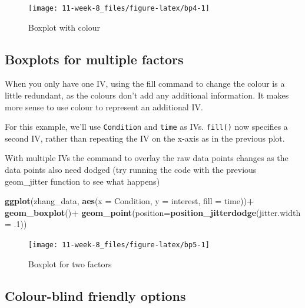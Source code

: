 \documentclass[]{book}
\newenvironment{Shaded}{\begin{snugshade}}{\end{snugshade}}
\newcommand{\DataTypeTok}[1]{\textcolor[rgb]{0.13,0.29,0.53}{#1}}
\newcommand{\FloatTok}[1]{\textcolor[rgb]{0.00,0.00,0.81}{#1}}
\newcommand{\KeywordTok}[1]{\textcolor[rgb]{0.13,0.29,0.53}{\textbf{#1}}}
\newcommand{\NormalTok}[1]{#1}
\newcommand{\OperatorTok}[1]{\textcolor[rgb]{0.81,0.36,0.00}{\textbf{#1}}}
\newcommand{\StringTok}[1]{\textcolor[rgb]{0.31,0.60,0.02}{#1}}
\begin{document}
\begin{figure}

{\centering \texttt{[image: 11-week-8\_files/figure-latex/bp4-1]} 

}

\caption{Boxplot with colour}\label{fig:bp4}
\end{figure}

\hypertarget{boxplots-for-multiple-factors}{%
\subsection{Boxplots for multiple factors}\label{boxplots-for-multiple-factors}}

When you only have one IV, using the fill command to change the colour is a little redundant, as the colours don't add any additional information. It makes more sense to use colour to represent an additional IV.

For this example, we'll use \texttt{Condition} and \texttt{time} as IVs. \texttt{fill()} now specifies a second IV, rather than repeating the IV on the x-axis as in the previous plot.

With multiple IVs the command to overlay the raw data points changes as the data points also need dodged (try running the code with the previous geom\_jitter function to see what happens)

\begin{Shaded}
\begin{Highlighting}[]
\KeywordTok{ggplot}\NormalTok{(zhang_data, }\KeywordTok{aes}\NormalTok{(}\DataTypeTok{x =}\NormalTok{ Condition, }\DataTypeTok{y =}\NormalTok{ interest, }\DataTypeTok{fill =}\NormalTok{ time))}\OperatorTok{+}
\StringTok{  }\KeywordTok{geom_boxplot}\NormalTok{()}\OperatorTok{+}
\StringTok{  }\KeywordTok{geom_point}\NormalTok{(}\DataTypeTok{position=}\KeywordTok{position_jitterdodge}\NormalTok{(}\DataTypeTok{jitter.width =} \FloatTok{.1}\NormalTok{))}
\end{Highlighting}
\end{Shaded}

\begin{figure}

{\centering \texttt{[image: 11-week-8\_files/figure-latex/bp5-1]} 

}

\caption{Boxplot for two factors}\label{fig:bp5}
\end{figure}

\hypertarget{colour-blind-friendly-options}{%
\subsection{Colour-blind friendly options}\label{colour-blind-friendly-options}}
\end{document}
